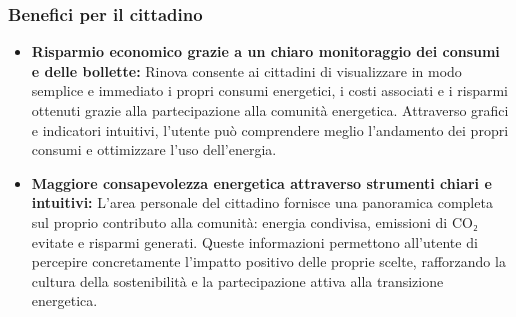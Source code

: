 \subsubsection*{Benefici per il cittadino}
\begin{itemize}
    \item \textbf{Risparmio economico grazie a un chiaro monitoraggio dei consumi e delle bollette:}  
    Rinova consente ai cittadini di visualizzare in modo semplice e immediato i propri consumi energetici, i costi associati e i risparmi ottenuti grazie alla partecipazione alla comunità energetica.  
    Attraverso grafici e indicatori intuitivi, l’utente può comprendere meglio l’andamento dei propri consumi e ottimizzare l’uso dell’energia.
    

    
    \item \textbf{Maggiore consapevolezza energetica attraverso strumenti chiari e intuitivi:}  
    L’area personale del cittadino fornisce una panoramica completa sul proprio contributo alla comunità: energia condivisa, emissioni di CO₂ evitate e risparmi generati.  
    Queste informazioni permettono all’utente di percepire concretamente l’impatto positivo delle proprie scelte, rafforzando la cultura della sostenibilità e la partecipazione attiva alla transizione energetica.
\end{itemize}

